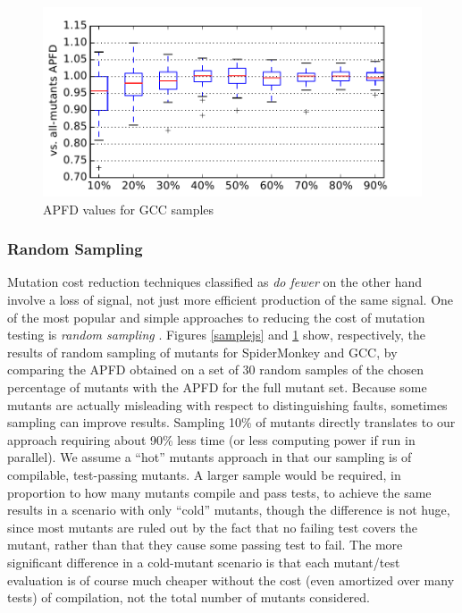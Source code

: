\begin{figure}
  \centering
  \includegraphics[width=0.95\columnwidth]{samplegcc}
  \caption{APFD values for GCC samples}
  \label{samplegcc}
\end{figure}%

\subsubsection{Random Sampling}

Mutation cost reduction techniques classified as \emph{do fewer} on the other hand involve a loss of signal, not just more efficient production of the same signal.   One of the most popular and simple approaches to reducing the cost of mutation testing is \emph{random sampling} \cite{budd1980mutation,acree1980mutation,RahulISSRE,MutRand}.
 Figures \ref{samplejs} and \ref{samplegcc} show, respectively, the results of random sampling of mutants for SpiderMonkey and GCC, by comparing the APFD obtained on a set of 30 random samples of the chosen percentage of mutants with the APFD for the full mutant set.  Because some mutants are actually misleading with respect to distinguishing faults, sometimes sampling can improve results.  Sampling 10\% of mutants directly translates to our approach requiring about 90\% less time (or less computing power if run in parallel).  We assume a ``hot'' mutants approach in that our sampling is of compilable, test-passing mutants.  A larger sample would be required, in proportion to how many mutants compile and pass tests, to achieve the same results in a scenario with only ``cold'' mutants, though the difference is not huge, since most mutants are ruled out by the fact that no failing test covers the mutant, rather than that they cause some passing test to fail.  The more significant difference in a cold-mutant scenario is that each mutant/test evaluation is of course much cheaper without the cost (even amortized over many tests) of compilation, not the total number of mutants considered.

